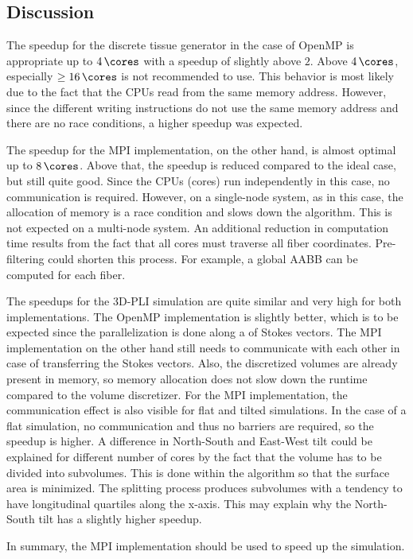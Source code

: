 \subsection{Discussion}
%
The speedup for the discrete tissue generator in the case of \ac{OpenMP} is appropriate up to $\SI{4}{\cores}$ with a speedup of slightly above $\num{2}$.
Above $\SI{4}{\cores}$, especially $\geq \SI{16}{\cores}$ is not recommended to use.
This behavior is most likely due to the fact that the \acp{CPU} read from the same memory address.
However, since the different writing instructions do not use the same memory address and there are no race conditions, a higher speedup was expected.
\par
%
The speedup for the \ac{MPI} implementation, on the other hand, is almost optimal up to $\SI{8}{\cores}$.
Above that, the speedup is reduced compared to the ideal case, but still quite good.
Since the \acp{CPU} (cores) run independently in this case, no communication is required.
However, on a single-node system, as in this case, the allocation of memory is a race condition and slows down the algorithm.
This is not expected on a multi-node system.
An additional reduction in computation time results from the fact that all cores must traverse all fiber coordinates.
Pre-filtering could shorten this process.
For example, a global \ac{AABB} can be computed for each fiber.
\par
%
The speedups for the \ac{3D-PLI} simulation are quite similar and very high for both implementations.
The \ac{OpenMP} implementation is slightly better, which is to be expected since the parallelization is done along a  of Stokes vectors.
The \ac{MPI} implementation on the other hand still needs to communicate with each other in case of transferring the Stokes vectors.
Also, the discretized volumes are already present in memory, so memory allocation does not slow down the runtime compared to the volume discretizer.
For the \ac{MPI} implementation, the communication effect is also visible for flat and tilted simulations.
In the case of a flat simulation, no communication and thus no barriers are required, so the speedup is higher.
A difference in North-South and East-West tilt could be explained for different number of cores by the fact that the volume has to be divided into subvolumes.
This is done within the algorithm so that the surface area is minimized.
The splitting process produces subvolumes with a tendency to have longitudinal quartiles along the x-axis.
This may explain why the North-South tilt has a slightly higher speedup.
\par
%
In summary, the \ac{MPI} implementation should be used to speed up the simulation.
